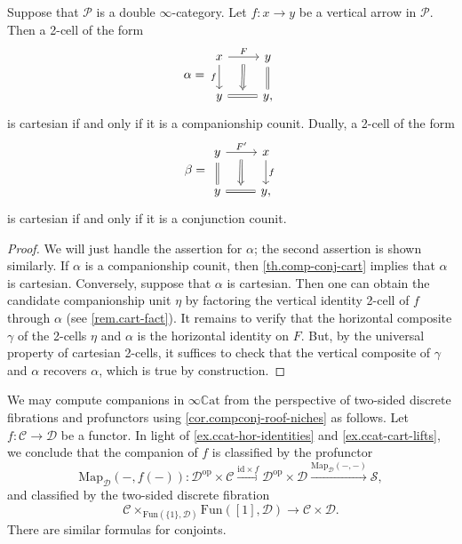 \documentclass[a4paper, 11pt]{amsart}
\numberwithin{theorem}{section}
\theoremstyle{definition}
\newcommand{\op}{\mathrm{op}}
\newcommand{\map}{\mathrm{Map}}
\newcommand{\fun}{\mathrm{Fun}}
\renewcommand{\S}{\mathscr{S}}
\newcommand{\C}{\mathscr{C}}
\renewcommand{\D}{\mathscr{D}}
\renewcommand{\P}{\mathscr{P}}
\newcommand{\id}{\mathrm{id}}
\newcommand{\CCAT}{\mathbb{C}\mathrm{at}}
\begin{document}
\begin{corollary}\label{cor.compconj-roof-niches}
	Suppose that $\P$ is a double $\infty$-category. 
	Let $f : x \rightarrow y$ be a vertical arrow in $\P$. Then a 2-cell of the form
	\[
	\alpha = \begin{tikzcd}
		x\arrow[d,"f"']\arrow[r,"F"name=f] & y \arrow[d,equal] \\ 
		y \arrow[r,equal,""name=t] & y,
		\arrow[from=f,to=t,Rightarrow, shorten <= 6pt]
	\end{tikzcd} 
	\]
	is cartesian if and only if it is a companionship counit. Dually, a 2-cell of the form 
	\[
		\beta = \begin{tikzcd}
			y\arrow[d,equal]\arrow[r,"F'"name=f] & x \arrow[d, "f"] \\ 
			y \arrow[r,equal,""name=t] & y,
			\arrow[from=f,to=t,Rightarrow, shorten <= 6pt]
		\end{tikzcd} 
	\]
	is cartesian if and only if it is a conjunction counit. 
\end{corollary}
\begin{proof}
	We will just handle the assertion for $\alpha$; the second assertion is shown similarly. If $\alpha$ is a companionship counit, then \cref{th.comp-conj-cart} implies that $\alpha$ is cartesian. 
	Conversely, suppose that $\alpha$ is cartesian. Then one can obtain the candidate companionship unit $\eta$ by factoring the vertical identity 2-cell of $f$ through $\alpha$ (see \cref{rem.cart-fact}).
	It remains to verify that the horizontal composite $\gamma$ of the 2-cells $\eta$ and $\alpha$ is the horizontal identity on $F$. But, by the universal property of cartesian 2-cells, 
	it suffices to check that the vertical composite of $\gamma$ and $\alpha$ recovers $\alpha$, which is true by construction.
\end{proof}

\begin{example}\label{ex.compconj-ccat-prof-tdfib}
	We may compute companions in $\infty\CCAT$ from the perspective 
	of two-sided discrete fibrations and profunctors using \cref{cor.compconj-roof-niches} as follows. Let $f : \C \rightarrow \D$ be a functor. 
	In light of \cref{ex.ccat-hor-identities} and  \cref{ex.ccat-cart-lifts}, we conclude that the companion of $f$ is classified by the profunctor 
	$$
	\map_\D(-, f(-)) : \D^\op \times \C \xrightarrow{\id \times f} \D^\op \times \D \xrightarrow{\map_\D(-,-)}\S,
	$$
	and classified by the two-sided discrete fibration 
	$$
		\C \times_{\fun(\{1\}, \D)} \fun([1], \D)  \rightarrow \C \times \D.
	$$
	There are similar formulas for conjoints.
\end{example}
\end{document}
